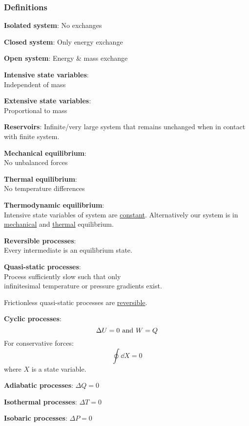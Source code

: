 \documentclass{article}
\begin{document}
\begin{multicols*}{3}
\noindent

\subsubsection*{Definitions}

\textbf{Isolated system}: No exchanges

\textbf{Closed system}: Only energy exchange

\textbf{Open system}: Energy \& mass exchange

\textbf{Intensive state variables}: \\
Independent of mass

\textbf{Extensive state variables}: \\
Proportional to mass

\textbf{Reservoirs}: Infinite/very large system
that remains unchanged when in contact
with finite system.

\textbf{Mechanical equilibrium}: \\
No unbalanced forces

\textbf{Thermal equilibrium}: \\
No temperature differences

\textbf{Thermodynamic equilibrium}: \\
Intensive state variables of system are \underline{constant}.
Alternatively our system is in \underline{mechanical} and
\underline{thermal} equilibrium.

\textbf{Reversible processes}: \\
Every intermediate is an equilibrium state.

\textbf{Quasi-static processes}: \\
Process sufficiently slow such that only \\
infinitesimal temperature or pressure gradients exist.

Frictionless quasi-static processes are \underline{reversible}.

\textbf{Cyclic processes}:
$$\Delta U=0
\hspace{0.05in}\text{and}\hspace{0.05in}
W=Q$$
For conservative forces:
$$\oint\dd X=0$$
where $X$ is a state variable.

\textbf{Adiabatic processes}: $\Delta Q=0$

\textbf{Isothermal processes}: $\Delta T=0$

\textbf{Isobaric processes}: $\Delta P=0$


\end{multicols*}
\end{document}
